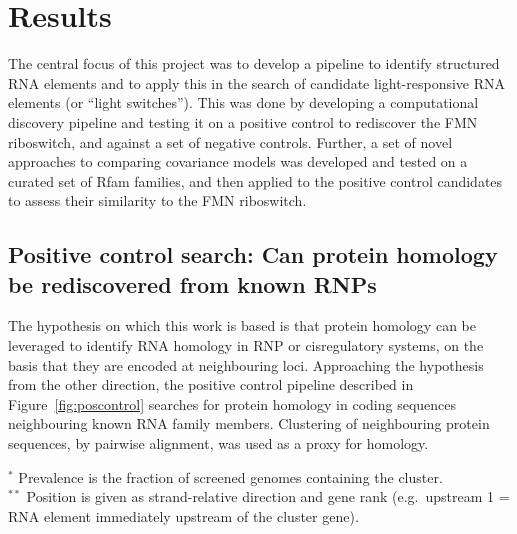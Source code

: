 \chapter{Results}

The central focus of this project was to develop a pipeline to identify structured RNA elements and to apply this in the search of candidate light-responsive RNA elements (or ``light switches'').
This was done by developing a computational discovery pipeline and testing it on a positive control to rediscover the \ac{FMN} riboswitch, and against a set of negative controls.
Further, a set of novel approaches to comparing covariance models was developed and tested on a curated set of Rfam families, and then applied to the positive control candidates to assess their similarity to the \ac{FMN} riboswitch.

\section{Positive control search: Can protein homology be rediscovered from known \ac{RNP}s}

The hypothesis on which this work is based is that protein homology can be leveraged to identify RNA homology in \ac{RNP} or cisregulatory systems, on the basis that they are encoded at neighbouring loci.
Approaching the hypothesis from the other direction, the positive control pipeline described in Figure~\ref{fig:poscontrol} searches for protein homology in coding sequences neighbouring known RNA family members.
Clustering of neighbouring protein sequences, by pairwise alignment, was used as a proxy for homology.

\begin{table}[H]
\centering
\footnotesize
\caption[Top cluster for each RNA family]{\textbf{Top cluster (by genome prevalence) for each RNA family}
    Top cluster (by genome prevalence) for each RNA family, identified by the positive control pipeline.
    These are the sourced from the coding regions within 1000nt of the RNA family members, and clustered by protein homology.}
    \label{tab:results_summary}
    
    \par\smallskip
    \begin{minipage}{\textwidth}
        \raggedright
        $^{*}$ Prevalence is the fraction of screened genomes containing the cluster.\\
        $^{**}$ Position is given as strand-relative direction and gene rank (e.g.\ upstream 1 = RNA element immediately upstream of the cluster gene).
    \end{minipage}
\end{table}

